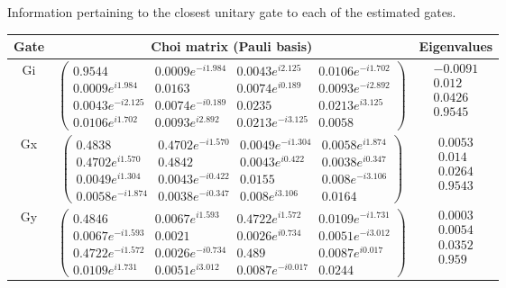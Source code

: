 {\begin{table}[h]
\begin{center}
\caption{Information pertaining to the closest unitary gate to each of the estimated gates.\label{bestCPTPGatesetClosestUnitaryTable}}
\end{center}
\end{table}


\begin{table}[h]
\begin{center}
\begin{tabular}[l]{|c|c|c|}
\hline
Gate & Choi matrix (Pauli basis) & Eigenvalues \\ \hline
Gi & $ \left(\!\!\begin{array}{cccc}
0.9544 & 0.0009e^{-i1.984} & 0.0043e^{i2.125} & 0.0106e^{-i1.702} \\ 
0.0009e^{i1.984} & 0.0163 & 0.0074e^{i0.189} & 0.0093e^{-i2.892} \\ 
0.0043e^{-i2.125} & 0.0074e^{-i0.189} & 0.0235 & 0.0213e^{i3.125} \\ 
0.0106e^{i1.702} & 0.0093e^{i2.892} & 0.0213e^{-i3.125} & 0.0058
 \end{array}\!\!\right) $
 & $ \begin{array}{c}
-0.0091 \\ 
0.012 \\ 
0.0426 \\ 
0.9545
 \end{array} $
 \\ \hline
Gx & $ \left(\!\!\begin{array}{cccc}
0.4838 & 0.4702e^{-i1.570} & 0.0049e^{-i1.304} & 0.0058e^{i1.874} \\ 
0.4702e^{i1.570} & 0.4842 & 0.0043e^{i0.422} & 0.0038e^{i0.347} \\ 
0.0049e^{i1.304} & 0.0043e^{-i0.422} & 0.0155 & 0.008e^{-i3.106} \\ 
0.0058e^{-i1.874} & 0.0038e^{-i0.347} & 0.008e^{i3.106} & 0.0164
 \end{array}\!\!\right) $
 & $ \begin{array}{c}
0.0053 \\ 
0.014 \\ 
0.0264 \\ 
0.9543
 \end{array} $
 \\ \hline
Gy & $ \left(\!\!\begin{array}{cccc}
0.4846 & 0.0067e^{i1.593} & 0.4722e^{i1.572} & 0.0109e^{-i1.731} \\ 
0.0067e^{-i1.593} & 0.0021 & 0.0026e^{i0.734} & 0.0051e^{-i3.012} \\ 
0.4722e^{-i1.572} & 0.0026e^{-i0.734} & 0.489 & 0.0087e^{i0.017} \\ 
0.0109e^{i1.731} & 0.0051e^{i3.012} & 0.0087e^{-i0.017} & 0.0244
 \end{array}\!\!\right) $
 & $ \begin{array}{c}
0.0003 \\ 
0.0054 \\ 
0.0352 \\ 
0.959
 \end{array} $
 \\ \hline
\end{tabular}


\end{center}
\end{table}}

